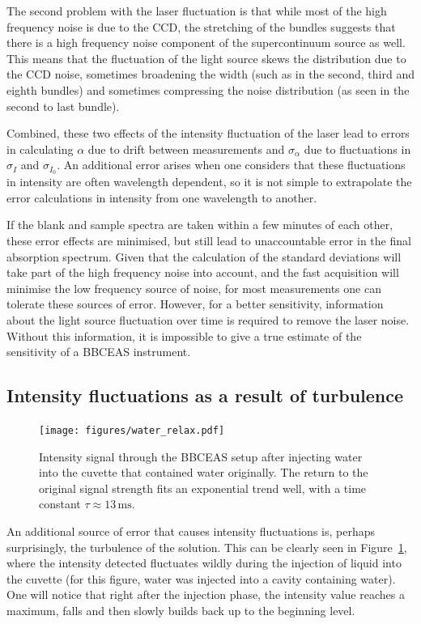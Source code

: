 The second problem with the laser fluctuation is that while most of the high
frequency noise is due to the \ac{CCD}, the stretching of the bundles suggests
that there is a high frequency noise component of the supercontinuum source as
well. This means that the fluctuation of the light source skews the
distribution due to the \ac{CCD} noise, sometimes broadening the width (such as
in the second, third and eighth bundles) and sometimes compressing the noise
distribution (as seen in the second to last bundle).

Combined, these two effects of the intensity fluctuation of the laser lead to
errors in calculating $\alpha$ due to drift between measurements and
$\sigma_{\alpha}$ due to fluctuations in $\sigma_{I}$ and $\sigma_{I_0}$. An
additional error arises when one considers that these fluctuations in
intensity are often wavelength dependent, so it is not simple to extrapolate
the error calculations in intensity from one wavelength to another.

If the blank and sample spectra are taken within a few minutes of each other,
these error effects are minimised, but still lead to unaccountable error in the
final absorption spectrum. Given that the calculation of the standard
deviations will take part of the high frequency noise into account, and the
fast acquisition will minimise the low frequency source of noise, for most
measurements one can tolerate these sources of error. However, for a
better sensitivity, information about the light source fluctuation over time is
required to remove the laser noise. Without this information, it is impossible
to give a true estimate of the sensitivity of a \ac{BBCEAS} instrument.

\subsection{Intensity fluctuations as a result of turbulence}

\begin{figure}
\begin{center}
\texttt{[image: figures/water\_relax.pdf]}
\end{center}
\caption{Intensity signal through the \ac{BBCEAS} setup after injecting water into the cuvette that contained water originally. The return to the original signal strength fits an exponential trend well, with a time constant $\tau \approx 13\,\text{ms}$.}
\label{fig:relax}
\end{figure}

An additional source of error that causes intensity fluctuations is, perhaps
surprisingly, the turbulence of the solution. This can be clearly seen in
Figure~\ref{fig:relax}, where the intensity detected fluctuates wildly during
the injection of liquid into the cuvette (for this figure, water was injected
into a cavity containing water). One will notice that right after the injection
phase, the intensity value reaches a maximum, falls and then slowly builds back
up to the beginning level.

